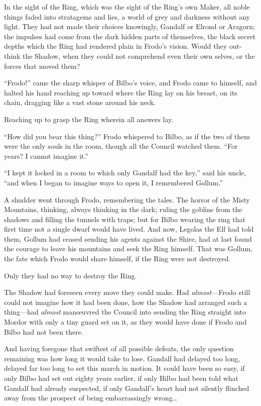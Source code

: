 In the sight of the Ring, which was the sight of the Ring’s own Maker, all noble things faded into stratagems and lies, a world of grey and darkness without any light. They had not made their choices knowingly, Gandalf or Elrond or Aragorn; the impulses had come from the dark hidden parts of themselves, the black secret depths which the Ring had rendered plain in Frodo’s vision. Would they out-think the Shadow, when they could not comprehend even their own selves, or the forces that moved them?

“Frodo!” came the sharp whisper of Bilbo’s voice, and Frodo came to himself, and halted his hand reaching up toward where the Ring lay on his breast, on its chain, dragging like a vast stone around his neck.

Reaching up to grasp the Ring wherein all answers lay.

“How did you bear this thing?” Frodo whispered to Bilbo, as if the two of them were the only souls in the room, though all the Council watched them. “For years? I cannot imagine it.”

“I kept it locked in a room to which only Gandalf had the key,” said his uncle, “and when I began to imagine ways to open it, I remembered Gollum.”

A shudder went through Frodo, remembering the tales. The horror of the Misty Mountains, thinking, always thinking in the dark; ruling the goblins from the shadows and filling the tunnels with traps; but for Bilbo wearing the ring that first time not a single dwarf would have lived. And now, Legolas the Elf had told them, Gollum had ceased sending his agents against the Shire, had at last found the courage to leave his mountains and seek the Ring himself. That was Gollum, the fate which Frodo would share himself, if the Ring were not destroyed.

Only they had no way to destroy the Ring.

The Shadow had foreseen every move they could make. Had \emph{almost}—Frodo still could not imagine how it had been done, how the Shadow had arranged such a thing—had \emph{almost} manœuvred the Council into sending the Ring straight into Mordor with only a tiny guard set on it, as they would have done if Frodo and Bilbo had not been there.

And having foregone that swiftest of all possible defeats, the only question remaining was how long it would take to lose. Gandalf had delayed too long, delayed far too long to set this march in motion. It could have been so easy, if only Bilbo had set out eighty years earlier, if only Bilbo had been told what Gandalf had already suspected, if only Gandalf’s heart had not silently flinched away from the prospect of being embarrassingly wrong…

